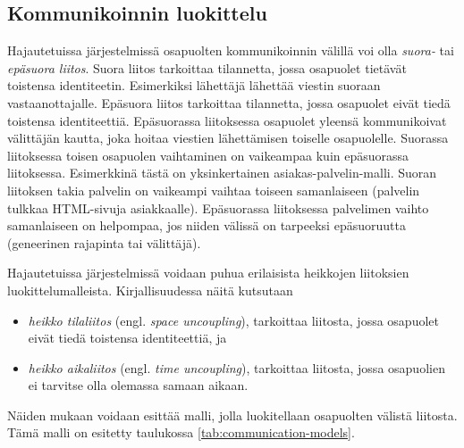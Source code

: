 \subsection{Kommunikoinnin luokittelu}
\label{ch:liitokset}
Hajautetuissa järjestelmissä osapuolten kommunikoinnin välillä voi olla \emph{suora-} tai \emph{epäsuora liitos}. Suora liitos tarkoittaa tilannetta, jossa osapuolet tietävät toistensa identiteetin. Esimerkiksi lähettäjä lähettää viestin suoraan vastaanottajalle. Epäsuora liitos tarkoittaa tilannetta, jossa osapuolet eivät tiedä toistensa identiteettiä. Epäsuorassa liitoksessa osapuolet yleensä kommunikoivat välittäjän kautta, joka hoitaa viestien lähettämisen toiselle osapuolelle. Suorassa liitoksessa toisen osapuolen vaihtaminen on vaikeampaa kuin epäsuorassa liitoksessa. Esimerkkinä tästä on yksinkertainen asiakas-palvelin-malli. Suoran liitoksen takia palvelin on vaikeampi vaihtaa toiseen samanlaiseen (palvelin tulkkaa HTML-sivuja asiakkaalle). Epäsuorassa liitoksessa palvelimen vaihto samanlaiseen on helpompaa, jos niiden välissä on tarpeeksi epäsuoruutta (geneerinen rajapinta tai välittäjä). \cite[s.~230]{distributed-systems-concepts-and-design}

Hajautetuissa järjestelmissä voidaan puhua erilaisista heikkojen liitoksien luokittelumalleista. Kirjallisuudessa näitä kutsutaan
\begin{itemize}
	\item \emph{heikko tilaliitos} (engl. \emph{space uncoupling}), tarkoittaa liitosta, jossa osapuolet eivät tiedä toistensa identiteettiä, ja
	\item \emph{heikko aikaliitos} (engl. \emph{time uncoupling}), tarkoittaa liitosta, jossa osapuolien ei tarvitse olla olemassa samaan aikaan.
\end{itemize}
Näiden mukaan voidaan esittää malli, jolla luokitellaan osapuolten välistä liitosta. Tämä malli on esitetty taulukossa \ref{tab:communication-models}. \cite[s.~230]{distributed-systems-concepts-and-design} \cite[s.~116]{eugster2003many}

